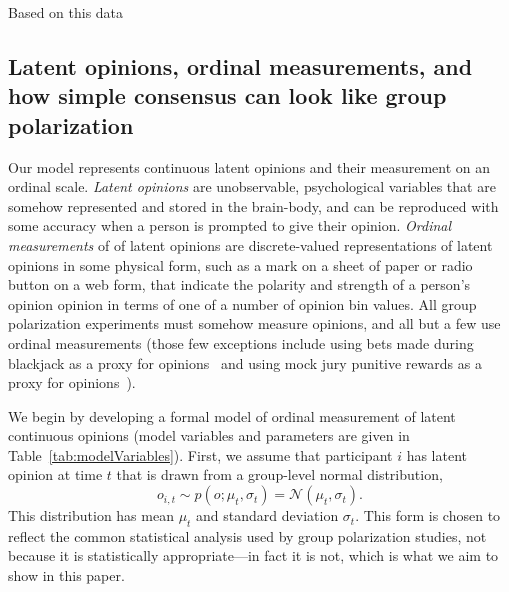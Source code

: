 \documentclass[11pt, letterpaper]{article}
\begin{document}
Based on this data



\subsection{Latent opinions, ordinal measurements, and how simple consensus can look like
group polarization}

Our model represents continuous latent opinions and their 
measurement on an ordinal scale. \emph{Latent opinions} are 
unobservable, psychological variables that are 
somehow represented and stored in the brain-body, and can be reproduced with
some accuracy when a person is prompted to give their opinion. 
\emph{Ordinal measurements} of 
of latent opinions are discrete-valued representations of latent opinions 
in some physical form, such as a mark on a sheet of paper or radio button on a web form, that
indicate the polarity and strength of a person's opinion opinion in terms of
one of a number of opinion bin values. All group polarization experiments must somehow
measure opinions, and all but a few use ordinal measurements (those few exceptions include
using bets made during blackjack as a proxy for opinions~\cite{Blascovich1973,Blascovich1975,Blascovich1976}
and using mock jury punitive rewards as a proxy for opinions~\cite{Schkade2000}).


We begin by developing a formal model of ordinal measurement of latent continuous
opinions (model variables and parameters are given in Table~\ref{tab:modelVariables}).
First, we assume that participant $i$ has latent opinion at time $t$ that is drawn from
a group-level normal distribution,
\begin{equation}
  o_{i,t} \sim p(o; \mu_t, \sigma_t) = \mathcal{N}(\mu_t, \sigma_t).
  \label{eq:opinionDistribution}
\end{equation}
\noindent 
This distribution has mean $\mu_t$ and standard deviation $\sigma_t$.
This form is chosen to
reflect the common statistical analysis used by group polarization studies,
not because it is statistically appropriate---in fact it is not, which is what
we aim to show in this paper.
\end{document}
